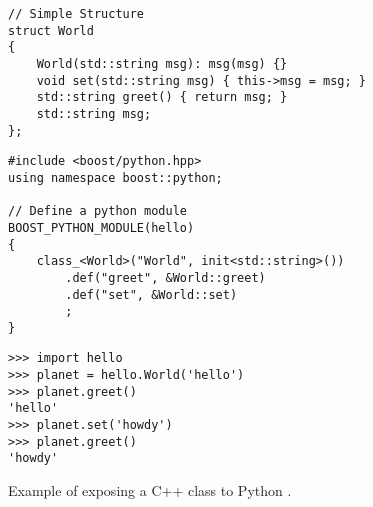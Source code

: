 \begin{listing}[hp!]
\begin{verbatim}
// Simple Structure
struct World
{
    World(std::string msg): msg(msg) {} 
    void set(std::string msg) { this->msg = msg; }
    std::string greet() { return msg; }
    std::string msg;
};
\end{verbatim}

\begin{verbatim}
#include <boost/python.hpp>
using namespace boost::python;

// Define a python module
BOOST_PYTHON_MODULE(hello)
{
    class_<World>("World", init<std::string>())
        .def("greet", &World::greet)
        .def("set", &World::set)
        ;
}
\end{verbatim}

\begin{verbatim}
>>> import hello
>>> planet = hello.World('hello')
>>> planet.greet()
'hello'
>>> planet.set('howdy')
>>> planet.greet()
'howdy'
\end{verbatim}
\caption{Example of exposing a C++ class to Python \cite{Boost1.53.0:Python}.}
\label{lst:lua:python-example}
\end{listing}

